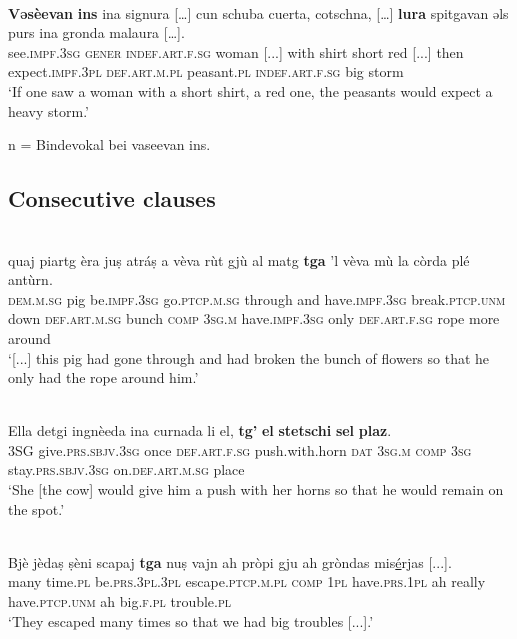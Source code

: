 \ea\label{}
\\
\gll    \textbf{Vǝsèevan} \textbf{ins} ina signura […] cun schuba cuerta, cotschna, […] \textbf{lura} spitgavan ǝls purs ina gronda malaura […].\\
     see.\textsc{impf.3sg} \textsc{gener} \textsc{indef.art.f.sg} woman [...] with shirt short red [...] then expect.\textsc{impf.3pl} \textsc{def.art.m.pl} peasant.\textsc{pl} \textsc{indef.art.f.sg} big storm\\
\glt `If one saw a woman with a short shirt, a red one, the peasants would expect a heavy storm.'
\z

n = Bindevokal bei vaseevan ins.


\subsection{Consecutive clauses}

\ea\label{}
\\
	\gll    [...] quaj piartg èra juṣ atráṣ a vèva rùt gjù al matg \textbf{tga} ’l vèva mù la còrda plé antùrn.\\
{} \textsc{dem.m.sg} pig be.\textsc{impf.3sg} go.\textsc{ptcp.m.sg} through and have.\textsc{impf.3sg} break.\textsc{ptcp.unm} down \textsc{def.art.m.sg} bunch  \textsc{comp} \textsc{3sg.m} have.\textsc{impf.3sg} only \textsc{def.art.f.sg} rope more around\\
\glt `[...] this pig had gone through and had broken the bunch of flowers so that he only had the rope around him.'
\z


\ea
\label{}
\\
\gll  Ella detgi ingnèeda ina curnada li el, \textbf{tg’} \textbf{el} \textbf{stetschi} \textbf{sel} \textbf{plaz}.\\
     3SG give.\textsc{prs.sbjv.3sg} once \textsc{def.art.f.sg} push.with.horn  \textsc{dat} \textsc{3sg.m} \textsc{comp} \textsc{3sg} stay.\textsc{prs.sbjv.3sg} on.\textsc{def.art.m.sg} place \\
\glt `She [the cow] would give him a push with her horns so that he would remain on the spot.'
\z

\ea\label{}
\\
\gll  Bjè jèdaṣ ṣèni scapaj \textbf{tga} nuṣ vajn ah pròpi gju ah gròndas mis\underline{é}rjas [...].\\
many time.\textsc{pl} be.\textsc{prs.3pl.3pl} escape.\textsc{ptcp.m.pl} \textsc{comp} \textsc{1pl}   have.\textsc{prs.1pl} ah really have.\textsc{ptcp.unm} ah big.\textsc{f.pl} trouble.\textsc{pl}\\
\glt `They escaped many times so that we had big troubles [...].'
\z


